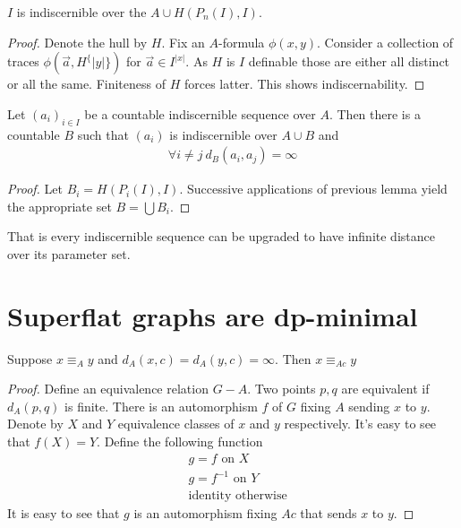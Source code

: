 \documentclass{amsart}
\begin{document}
\begin{Lemma}
	$I$ is indiscernible over the $A \cup H(P_n(I), I)$.
\end{Lemma}

\begin{proof}
	Denote the hull by $H$. Fix an $A$-formula $\phi(x,y)$. Consider a collection of traces $\phi(\vec a, H^\{|y|\})$ for $\vec a \in I^{|x|}$. As $H$ is $I$ definable those are either all distinct or all the same. Finiteness of $H$ forces latter. This shows indiscernability.
\end{proof}

\begin{Corollary}
	Let $(a_i)_{i \in I}$ be a countable indiscernible sequence over $A$. Then there is a countable $B$ such that  $(a_i)$ is indiscernible over $A \cup B$ and
	\begin{align*}
		\forall i \neq j \ d_B(a_i, a_j) = \infty
	\end{align*}
\end{Corollary}

\begin{proof}
	Let $B_i = H(P_i(I), I)$. Successive applications of previous lemma yield the appropriate set $B = \bigcup B_i$.
\end{proof}

That is every indiscernible sequence can be upgraded to have infinite distance over its parameter set.

\section{Superflat graphs are dp-minimal}

\begin{Lemma}
	Suppose $x \equiv_A y$ and $d_A(x, c) = d_A(y, c) = \infty$. Then $x \equiv_{Ac} y$
\end{Lemma}

\begin{proof}
	Define an equivalence relation $G - A$. Two points $p, q$ are equivalent if $d_A(p,q)$ is finite. There is an automorphism $f$ of $G$ fixing $A$ sending $x$ to $y$. Denote by $X$ and $Y$ equivalence classes of $x$ and $y$ respectively. It's easy to see that $f(X) = Y$. Define the following function
	\begin{align*}
		&g = f \text { on } X \\
		&g = f^{-1} \text { on } Y \\
		&\text{identity otherwise}
	\end{align*}
	It is easy to see that $g$ is an automorphism fixing $Ac$ that sends $x$ to $y$.
\end{proof}
\end{document}

